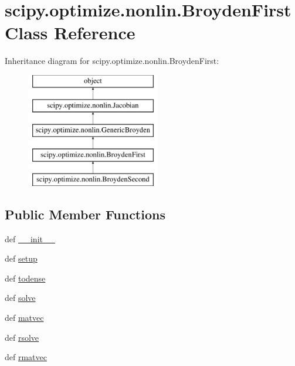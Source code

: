 \hypertarget{classscipy_1_1optimize_1_1nonlin_1_1BroydenFirst}{}\section{scipy.\+optimize.\+nonlin.\+Broyden\+First Class Reference}
\label{classscipy_1_1optimize_1_1nonlin_1_1BroydenFirst}
Inheritance diagram for scipy.\+optimize.\+nonlin.\+Broyden\+First\+:\begin{figure}[H]
\begin{center}
\leavevmode
\includegraphics[height=5.000000cm]{classscipy_1_1optimize_1_1nonlin_1_1BroydenFirst}
\end{center}
\end{figure}
\subsection*{Public Member Functions}
\begin{DoxyCompactItemize}
\item 
def \hyperlink{classscipy_1_1optimize_1_1nonlin_1_1BroydenFirst_aaf46017adfad7948873d8cae9a7dd904}{\+\_\+\+\_\+init\+\_\+\+\_\+}
\item 
def \hyperlink{classscipy_1_1optimize_1_1nonlin_1_1BroydenFirst_a76a12bdad27e34fab788d109c5771ded}{setup}
\item 
def \hyperlink{classscipy_1_1optimize_1_1nonlin_1_1BroydenFirst_ad99dee8aac1bf5a745d30b962923f435}{todense}
\item 
def \hyperlink{classscipy_1_1optimize_1_1nonlin_1_1BroydenFirst_a35fc23dd363873412ab57d632aca34f9}{solve}
\item 
def \hyperlink{classscipy_1_1optimize_1_1nonlin_1_1BroydenFirst_ae218abd46207c5f984d2994000d55a38}{matvec}
\item 
def \hyperlink{classscipy_1_1optimize_1_1nonlin_1_1BroydenFirst_ab098eb9629aabda44b40b9959448e6cc}{rsolve}
\item 
def \hyperlink{classscipy_1_1optimize_1_1nonlin_1_1BroydenFirst_a891ad7ebed401b5d9e34bf41dec4e206}{rmatvec}
\end{DoxyCompactItemize}
